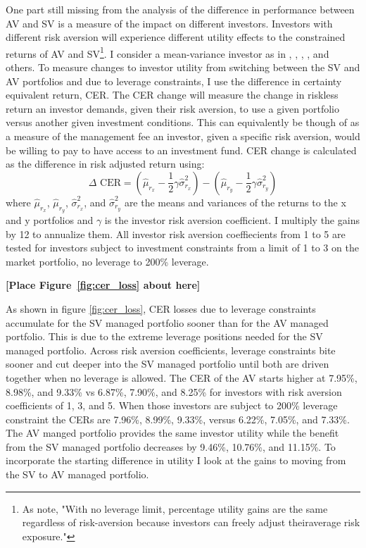 One part still missing from the analysis of the difference in performance between AV and SV is a measure of the impact on different investors. Investors with different risk aversion will experience different utility effects to the constrained returns of AV and SV\footnote{As \citet{moreira_volatility-managed_2017} note, "With no leverage limit, percentage utility gains are the same regardless of risk-aversion because investors can freely adjust theiraverage risk exposure."}. I consider a mean-variance investor as in \cite{Kandel1996}, \cite{Campbell2008}, \cite{Ferreira2011}, \cite{Rapach2016}, and others. To measure changes to investor utility from switching between the SV and AV portfolios and due to leverage constraints, I use the difference in certainty equivalent return, CER. The CER change will measure the change in riskless return an investor demands, given their risk aversion, to use a given portfolio versus another given investment conditions. This can equivalently be though of as a measure of the management fee an investor, given a specific risk aversion, would be willing to pay to have access to an investment fund. CER change is calculated as the difference in risk adjusted return using:
\begin{equation}
\Delta \text{ CER} = \left(\hat \mu_{r_{x}} - \frac{1}{2}\gamma\hat \sigma^{2}_{r_{x}}\right) - \left(\hat \mu_{r_{y}} - \frac{1}{2}\gamma\hat \sigma^{2}_{r_{y}}\right)
\end{equation}
where $\hat \mu_{r_{x}}$, $\hat \mu_{r_{y}}$, $\hat \sigma^{2}_{r_{x}}$, and $\hat \sigma^{2}_{r_{y}}$ are the means and
variances of the returns to the x and y portfolios and $\gamma$ is the investor risk aversion coefficient. I multiply the gains by 12 to annualize them. All investor risk aversion coeffiecients from 1 to 5 are tested for investors subject to investment constraints from a limit of 1 to 3 on the market portfolio, no leverage to 200\% leverage.

\bigskip
\centerline{\bf [Place Figure~\ref{fig:cer_loss} about here]}
\bigskip

As shown in figure \ref{fig:cer_loss}, CER losses due to leverage constraints accumulate for the SV managed portfolio sooner than for the AV managed portfolio. This is due to the extreme leverage positions needed for the SV managed portfolio. Across risk aversion coefficients, leverage constraints bite sooner and cut deeper into the SV managed portfolio until both are driven together when no leverage is allowed. The CER of the AV starts higher at 7.95\%, 8.98\%, and 9.33\% vs 6.87\%, 7.90\%, and 8.25\% for investors with risk aversion coefficients of 1, 3, and 5. When those investors are subject to 200\% leverage constraint the CERs are 7.96\%, 8.99\%, 9.33\%, versus 6.22\%, 7.05\%, and 7.33\%. The AV manged portfolio provides the same investor utility while the benefit from the SV managed portfolio decreases by 9.46\%, 10.76\%, and 11.15\%. To incorporate the starting difference in utility I look at the gains to moving from the SV to AV managed portfolio. 


